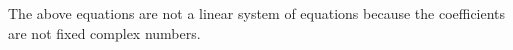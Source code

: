 \documentclass{ximera}
\begin{document}
\begin{example}
\begin{question}
\begin{question}
\begin{question}
        \begin{feedback}
          The above equations are not a linear system of equations because the coefficients are not fixed complex numbers.
        \end{feedback}
      \end{question}
      
    \end{question}
    
  \end{question}
  
\end{example}
\end{document}

